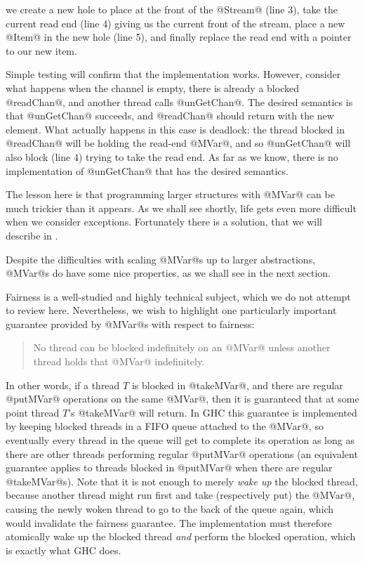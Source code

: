 \noindent we create a new hole to place at the front of the @Stream@
(line 3), take the current read end (line 4) giving us the current
front of the stream, place a new @Item@ in the new hole (line 5), and
finally replace the read end with a pointer to our new item.

Simple testing will confirm that the implementation works.  However,
consider what happens when the channel is empty, there is already a
blocked @readChan@, and another thread calls @unGetChan@.  The desired
semantics is that @unGetChan@ succeeds, and @readChan@ should return
with the new element.  What actually happens in this case is deadlock:
the thread blocked in @readChan@ will be holding the read-end @MVar@,
and so @unGetChan@ will also block (line 4) trying to take the read
end.  As far as we know, there is no implementation of @unGetChan@
that has the desired semantics.

The lesson here is that programming larger structures with @MVar@ can
be much trickier than it appears.  As we shall see shortly, life gets
even more difficult when we consider exceptions.  Fortunately there is
a solution, that we will describe in .

Despite the difficulties with scaling @MVar@s up to larger
abstractions, @MVar@s do have some nice properties, as we shall see in
the next section.


Fairness is a well-studied and highly technical subject, which we do
not attempt to review here.  Nevertheless, we wish to highlight one
particularly important guarantee provided by @MVar@s with respect to
fairness:

\begin{quote}
No thread can be blocked indefinitely on an @MVar@ unless another
thread holds that @MVar@ indefinitely.
\end{quote}

In other words, if a thread $T$ is blocked in @takeMVar@, and there
are regular @putMVar@ operations on the same @MVar@, then it is
guaranteed that at some point thread $T$'s @takeMVar@ will return.  In
GHC this guarantee is implemented by keeping blocked threads in a FIFO
queue attached to the @MVar@, so eventually every thread in the queue
will get to complete its operation as long as there are other threads
performing regular @putMVar@ operations (an equivalent guarantee
applies to threads blocked in @putMVar@ when there are regular
@takeMVar@s).  Note that it is not enough to merely \emph{wake up} the
blocked thread, because another thread might run first and take
(respectively put) the @MVar@, causing the newly woken thread to go to
the back of the queue again, which would invalidate the fairness
guarantee.  The implementation must therefore atomically wake up the
blocked thread \emph{and} perform the blocked operation, which is
exactly what GHC does.

